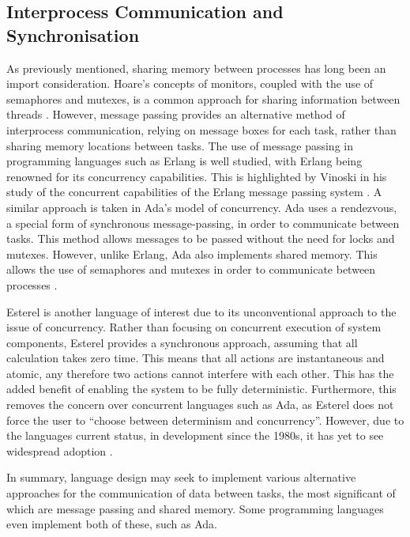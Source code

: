 \subsection{Interprocess Communication and Synchronisation} %
As previously mentioned, sharing memory between processes has long been an import
consideration. Hoare's concepts of monitors, coupled with the use of semaphores
and mutexes, is a common approach for sharing information between threads
\cite{Hoare:1974:MOS:355620.361161}.  However, message passing provides an
alternative method of interprocess communication, relying on message boxes for
each task, rather than sharing memory locations between tasks.  The use of
message passing in programming languages such as Erlang is well studied, with
Erlang being renowned for its concurrency capabilities. This is highlighted by
Vinoski in his study of the concurrent capabilities of the Erlang message
passing system \cite{6216341}. A similar approach is taken in Ada's model of
concurrency. Ada uses a rendezvous, a special form of synchronous
message-passing, in order to communicate between tasks. This method allows
messages to be passed without the need for locks and mutexes. However, unlike
Erlang, Ada also implements shared memory. This allows the use of semaphores
and mutexes in order to communicate between processes
\cite{burns1998concurrency}.  
\par\bigskip\noindent
Esterel is another language of interest due to its unconventional approach to the issue of 
concurrency. Rather than focusing on concurrent execution of system components, 
Esterel provides a synchronous approach, assuming that all calculation 
takes zero time. This means that all actions are instantaneous and atomic, 
any therefore two actions cannot interfere with each other. 
This has the added benefit of enabling the system to be fully deterministic. 
Furthermore, this removes the concern over concurrent languages such as Ada, 
as Esterel does not force the user to ``choose between determinism and concurrency''.
However, due to the languages current status, in development since the 1980s, 
it has yet to see widespread adoption
\cite{esterel}.
\par\bigskip\noindent
In summary, language design
may seek to implement various alternative approaches for the communication of data
between tasks, the most significant of which are message passing and shared memory. 
Some programming languages even implement both of these, such as Ada.

